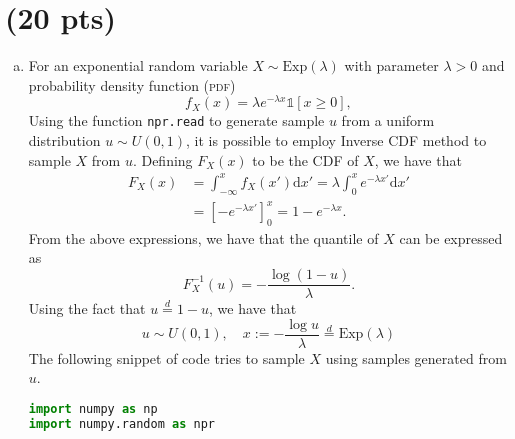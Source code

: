 \section{ (20 pts)}
\begin{enumerate} [(a)]
	\item \label{1(a)} For an exponential random variable $X \sim \mathrm{Exp}(\lambda)$ with parameter $\lambda > 0$ and probability density function (\textsc{pdf})
	\begin{equation*}
		f_X(x) = \lambda e^{-\lambda x} \mathds{1}\!\left[x \geq 0\right],
	\end{equation*}
	Using the function \verb*|npr.read| to generate sample $u$ from a uniform distribution $u \sim U(0,1)$, it is possible to employ Inverse CDF method to sample $X$ from $u$. Defining $F_X(x)$ to be the CDF of $X$, we have that
	\begin{equation*}
		\begin{aligned}
			F_X(x) &= \int_{-\infty}^x f_X(x')\mathrm{d}x' = \lambda \int_{0}^{x} e^{-\lambda x'} \mathrm{d}x' \\
			 &= \left[-e^{-\lambda x'}\right]_0^x = 1 - e^{-\lambda x}.
		\end{aligned}
	\end{equation*}
	From the above expressions, we have that the quantile of $X$ can be expressed as
	\begin{equation*}
		F_X^{-1}(u) = -\frac{\log(1-u)}{\lambda}.
	\end{equation*}
	Using the fact that $u \overset{d}{=} 1-u$, we have that
	\begin{equation*}
		u \sim U(0,1),\quad x := -\frac{\log u}{\lambda} \overset{d}{=} \mathrm{Exp}(\lambda)
	\end{equation*}
	The following snippet of code tries to sample $X$ using samples generated from $u$.
	\begin{lstlisting}[language=Python]
import numpy as np
import numpy.random as npr


\end{lstlisting}
\end{enumerate}
